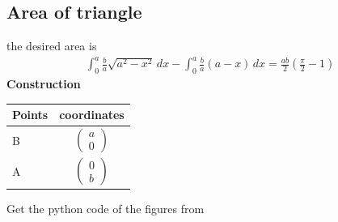 \documentclass[10pt,a4paper]{report}
\newcommand{\myvec}[1]{\ensuremath{\begin{pmatrix}#1\end{pmatrix}}}
\providecommand{\brak}[1]{\ensuremath{\left(#1\right)}}
\begin{document}
\begin{multicols}{2}
\subsection*{Area of triangle}

\fi
the desired area is
\begin{align}
\int_{0}^{a}\frac{b}{a}\sqrt{a^2-x^2} \,dx 
-\int_{0}^{a} \frac{b}{a}(a-x) \,dx
	= \frac{ab}{2}\brak{\frac{\pi}{2}-1}
\end{align}
\iffalse
 \vspace{2mm} \textbf{Construction}
\begin{center}
\setlength{\arrayrulewidth}{0.5mm}
\setlength{\tabcolsep}{6pt}
\renewcommand{\arraystretch}{1.5}
    \begin{tabular}{|l|c|}
    \hline 
    \textbf{Points} & \textbf{coordinates} \\ \hline
   B & $\myvec{
   a\\
   0
   } $ \\\hline
   A & $\myvec{
   0\\
   b
   } $ \\\hline
      \end{tabular}
  \end{center}
  \end{multicols}
 
Get the python code of the figures from

\begin{table}[h]
\large
\centering
{}

\end{table} 
 
\end{document}
